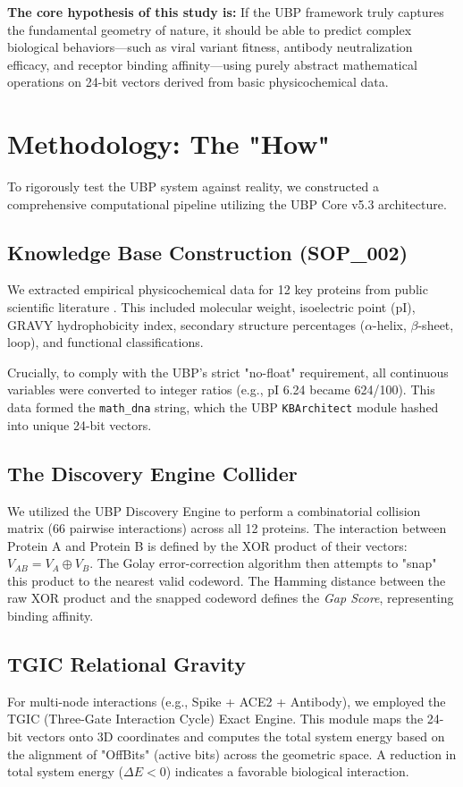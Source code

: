 \documentclass[11pt,a4paper]{article}
\begin{document}
\textbf{The core hypothesis of this study is:} If the UBP framework truly captures the fundamental geometry of nature, it should be able to predict complex biological behaviors—such as viral variant fitness, antibody neutralization efficacy, and receptor binding affinity—using purely abstract mathematical operations on 24-bit vectors derived from basic physicochemical data.

\section{Methodology: The "How"}

To rigorously test the UBP system against reality, we constructed a comprehensive computational pipeline utilizing the UBP Core v5.3 architecture.

\subsection{Knowledge Base Construction (SOP\_002)}
We extracted empirical physicochemical data for 12 key proteins from public scientific literature \cite{Scheller2020, Mancini2024}. This included molecular weight, isoelectric point (pI), GRAVY hydrophobicity index, secondary structure percentages ($\alpha$-helix, $\beta$-sheet, loop), and functional classifications. 

Crucially, to comply with the UBP's strict "no-float" requirement, all continuous variables were converted to integer ratios (e.g., pI 6.24 became 624/100). This data formed the \texttt{math\_dna} string, which the UBP \texttt{KBArchitect} module hashed into unique 24-bit vectors.

\subsection{The Discovery Engine Collider}
We utilized the UBP Discovery Engine to perform a combinatorial collision matrix (66 pairwise interactions) across all 12 proteins. The interaction between Protein A and Protein B is defined by the XOR product of their vectors: $V_{AB} = V_A \oplus V_B$. The Golay error-correction algorithm then attempts to "snap" this product to the nearest valid codeword. The Hamming distance between the raw XOR product and the snapped codeword defines the \textit{Gap Score}, representing binding affinity.

\subsection{TGIC Relational Gravity}
For multi-node interactions (e.g., Spike + ACE2 + Antibody), we employed the TGIC (Three-Gate Interaction Cycle) Exact Engine. This module maps the 24-bit vectors onto 3D coordinates and computes the total system energy based on the alignment of "OffBits" (active bits) across the geometric space. A reduction in total system energy ($\Delta E < 0$) indicates a favorable biological interaction.
\end{document}
